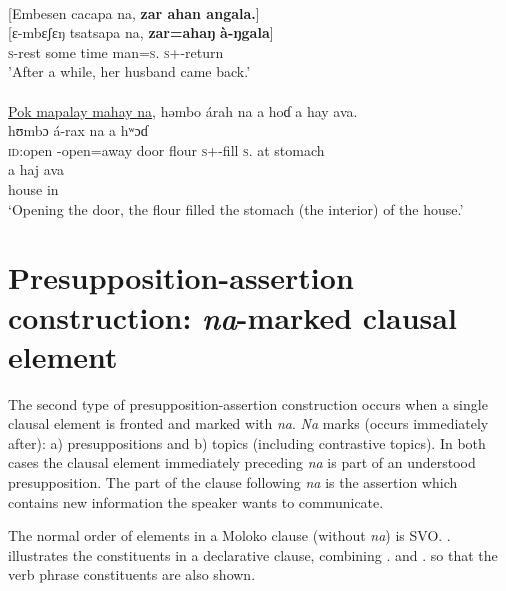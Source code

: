\ea \label{ex:11:26}
\\
{}[Embesen  cacapa  na,  \textbf{zar  ahan  angala.}]\\ 
\gll  {}[ɛ{}-mbɛʃɛŋ  tsatsapa  na, \textbf{zar}\textbf{=ahaŋ}  \textbf{à-ŋgala}]\\
      \textsc{s}-rest {some time} {\PSP}  man=\textsc{s}.{\POSS} \textsc{s}+{\PFV}-return\\
\glt  'After a while, her husband came back.'\\
\medskip
{}\\
 \underline{Pok  mapalay  mahay  na},  həmbo  árah  na  a  hoɗ  a  hay  ava.\\
\gll  {}        hʊmbɔ  á-rax   na   a  hʷɔɗ\\ 
      \textsc{id}:open  {\NOM}{}-open=away  door {\PSP}  flour \textsc{s}+{\IFV}-fill \textsc{s}.{\DO}  at  stomach\\ 
      
      \medskip
\gll a  haj    ava\\
     {\GEN}  house  in\\
\glt  ‘Opening the door, the flour filled the stomach (the interior) of the house.’
\z

\section{Presupposition-assertion construction: \textit{na}-marked clausal element}\label{sec:11.2}
\hypertarget{RefHeading1213241525720847}{}
The second type of presupposition-assertion construction occurs when a single clausal element is fronted and marked with \textit{na}. \textit{Na} marks (occurs immediately after): a) presuppositions and b) topics (including contrastive topics). In both cases the clausal element immediately preceding \textit{na}  is part of an understood presupposition. The part of the clause following \textit{na} is the assertion which contains new information the speaker wants to communicate.

The normal order of elements in a Moloko clause (without \textit{na}) is SVO. . illustrates the constituents in a declarative clause, combining . and . so that the verb phrase constituents are also shown.  

